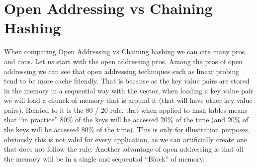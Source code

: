 \section{Open Addressing vs Chaining Hashing}

When comparing Open Addressing vs Chaining hashing we can cite many pros and cons. Let us start with the open addressing pros. Among the pros of open addressing we can see that open addressing techniques such as linear probing tend to be more cache friendly. That is because as the key value pairs are stored in the memory in a sequential way with the vector, when loading a key value pair we will load a chunck of memory that is around it (that will have other key value pairs). Related to it is the 80 / 20 rule, that when applied to hash tables means that ``in practice'' 80\% of the keys will be accessed 20\% of the time (and 20\% of the keys will be accessed 80\% of the time). This is only for illustration purposes, obviously this is not valid for every application, as we can artificially create one that does not follow the rule. Another advantage of open addressing is that all the memory will be in a single and sequential ``Block'' of memory. 